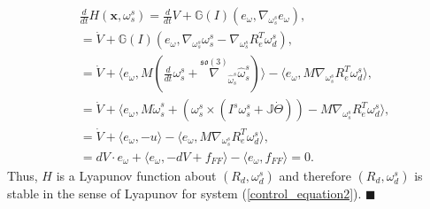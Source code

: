 \documentclass{ifacconf}
\begin{document}
\begin{align}
& \frac{d}{dt}H(\mathbf{x},\omega_{s}^{s}) = \frac{d}{dt}V + \mathbb{G}(I)(e_{\omega},\nabla_{\omega_{s}^{s}}e_{\omega}), \nonumber \\
& = \dot{V} + \mathbb{G}(I)(e_{\omega},\nabla_{\omega_{s}^{s}}\omega_{s}^{s} - \nabla_{\omega_{s}^{s}}R_{e}^{T} \omega_{d}^{s}), \nonumber \\
& = \dot{V} + \langle e_{\omega}, M\left( \frac{d}{dt}\omega_{s}^{s} + \overset{\mathfrak{so}(3)}{\nabla}_{\widehat{\omega}_{s}^{s}}\widehat{\omega}_{s}^{s} \right)  \rangle - \langle e_{\omega}, M \nabla_{\omega_{s}^{s}}R_{e}^{T} \omega_{d}^{s} \rangle, \nonumber  \\
& = \dot{V} + \langle e_{\omega}, M\dot{\omega}_{s}^{s} + ( \omega_{s}^{s} \times (I^{s}\omega_{s}^{s} + \mathbb{J} \dot{\Theta})) - M \nabla_{\omega_{s}^{s}}R_{e}^{T} \omega_{d}^{s} \rangle, \nonumber \\
& = \dot{V} + \langle e_{\omega}, - u \rangle - \langle e_{\omega}, M \nabla_{\omega_{s}^{s}}R_{e}^{T} \omega_{d}^{s} \rangle, \nonumber \\
& = dV \cdot e_{\omega} + \langle e_{\omega}, -dV + f_{FF}  \rangle - \langle e_{\omega}, f_{FF}\rangle = 0. \label{lyap:2}
\end{align}
Thus, $H$ is a Lyapunov function about $(R_{d}, \omega_{d}^{s})$ and therefore $(R_{d},\omega_{d}^{s})$ is stable in the sense of Lyapunov for system (\ref{control_equation2}). $\blacksquare$\\
\end{document}
